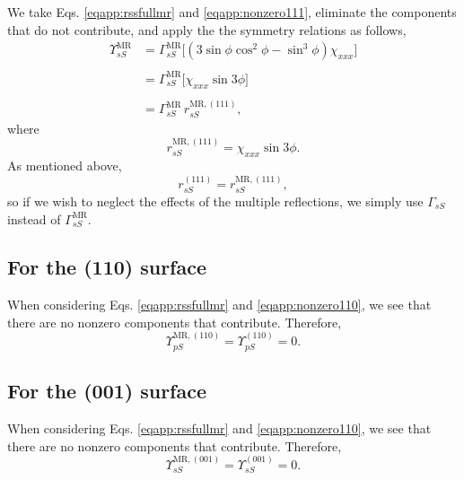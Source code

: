 We take Eqs. \eqref{eqapp:rssfullmr} and \eqref{eqapp:nonzero111}, eliminate the
components that do not contribute, and apply the the symmetry relations as
follows,
\begin{equation*}
\begin{split}
\Upsilon^{\mathrm{MR}}_{sS} &= 
\Gamma^{\mathrm{MR}}_{sS}
\big[
(3\sin\phi\cos^{2}\phi - \sin^{3}\phi)\chi_{xxx}
\big]\\\\
&= 
\Gamma^{\mathrm{MR}}_{sS}
\big[
\chi_{xxx}\sin3\phi
\big]\\\\
&= \Gamma^{\mathrm{MR}}_{sS}\,r^{\mathrm{MR},(111)}_{sS},
\end{split}
\end{equation*}
where
\begin{equation}\label{eqapp:final-rss.mr.111}
r^{\mathrm{MR},(111)}_{sS} = \chi_{xxx}\sin3\phi.
\end{equation}
As mentioned above,
\begin{equation}\label{eqapp:final-rss.111}
r^{(111)}_{sS} = r^{\mathrm{MR},(111)}_{sS},
\end{equation}
so if we wish to neglect the effects of the multiple reflections, we simply use
$\Gamma_{sS}$ instead of $\Gamma^{\mathrm{MR}}_{sS}$.


\subsection{For the (110) surface}

When considering Eqs. \eqref{eqapp:rssfullmr} and \eqref{eqapp:nonzero110}, we see
that there are no nonzero components that contribute. Therefore,
\begin{equation}\label{eqapp:final-rss.mr.110}
\Upsilon^{\mathrm{MR},(110)}_{pS} = \Upsilon^{(110)}_{pS} = 0.
\end{equation}


\subsection{For the (001) surface}

When considering Eqs. \eqref{eqapp:rssfullmr} and \eqref{eqapp:nonzero110}, we see
that there are no nonzero components that contribute. Therefore,
\begin{equation}\label{eqapp:final-rss.mr.001}
\Upsilon^{\mathrm{MR},(001)}_{sS} = \Upsilon^{(001)}_{sS} = 0.
\end{equation}


\stopcontents[chapters]
